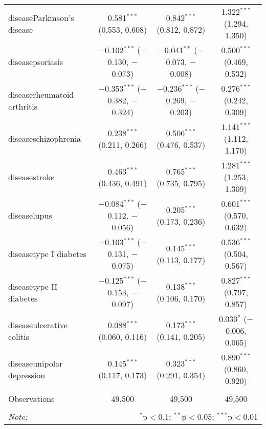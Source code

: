 \begin{table}[!htbp]
\begin{tabular}{@{\extracolsep{5pt}}lccc}
  diseaseParkinson's disease & 0.581$^{***}$ (0.553, 0.608) & 0.842$^{***}$ (0.812, 0.872) & 1.322$^{***}$ (1.294, 1.350) \\ 
  diseasepsoriasis & $-$0.102$^{***}$ ($-$0.130, $-$0.073) & $-$0.041$^{**}$ ($-$0.073, $-$0.008) & 0.500$^{***}$ (0.469, 0.532) \\ 
  diseaserheumatoid arthritis & $-$0.353$^{***}$ ($-$0.382, $-$0.324) & $-$0.236$^{***}$ ($-$0.269, $-$0.203) & 0.276$^{***}$ (0.242, 0.309) \\ 
  diseaseschizophrenia & 0.238$^{***}$ (0.211, 0.266) & 0.506$^{***}$ (0.476, 0.537) & 1.141$^{***}$ (1.112, 1.170) \\ 
  diseasestroke & 0.463$^{***}$ (0.436, 0.491) & 0.765$^{***}$ (0.735, 0.795) & 1.281$^{***}$ (1.253, 1.309) \\ 
  diseaselupus & $-$0.084$^{***}$ ($-$0.112, $-$0.056) & 0.205$^{***}$ (0.173, 0.236) & 0.601$^{***}$ (0.570, 0.632) \\ 
  diseasetype I diabetes & $-$0.103$^{***}$ ($-$0.131, $-$0.075) & 0.145$^{***}$ (0.113, 0.177) & 0.536$^{***}$ (0.504, 0.567) \\ 
  diseasetype II diabetes & $-$0.125$^{***}$ ($-$0.153, $-$0.097) & 0.138$^{***}$ (0.106, 0.170) & 0.827$^{***}$ (0.797, 0.857) \\ 
  diseaseulcerative colitis & 0.088$^{***}$ (0.060, 0.116) & 0.173$^{***}$ (0.141, 0.205) & 0.030$^{*}$ ($-$0.006, 0.065) \\ 
  diseaseunipolar depression & 0.145$^{***}$ (0.117, 0.173) & 0.323$^{***}$ (0.291, 0.354) & 0.890$^{***}$ (0.860, 0.920) \\ 
 \hline \\[-1.8ex] 
Observations & 49,500 & 49,500 & 49,500 \\ 
\hline 
\hline \\[-1.8ex] 
\textit{Note:}  & \multicolumn{3}{r}{$^{*}$p$<$0.1; $^{**}$p$<$0.05; $^{***}$p$<$0.01} \\ 
\end{tabular} 
\end{table} 

